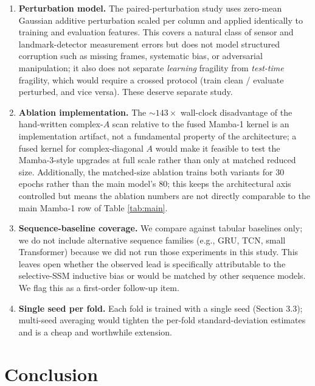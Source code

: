 \documentclass{article}
\begin{document}
\begin{enumerate}
    \item \textbf{Perturbation model.} The paired-perturbation study uses zero-mean Gaussian additive perturbation scaled per column and applied identically to training and evaluation features. This covers a natural class of sensor and landmark-detector measurement errors but does not model structured corruption such as missing frames, systematic bias, or adversarial manipulation; it also does not separate \emph{learning} fragility from \emph{test-time} fragility, which would require a crossed protocol (train clean / evaluate perturbed, and vice versa). These deserve separate study.

    \item \textbf{Ablation implementation.} The ${\sim}143\times$ wall-clock disadvantage of the hand-written complex-$A$ scan relative to the fused Mamba-1 kernel is an implementation artifact, not a fundamental property of the architecture; a fused kernel for complex-diagonal $A$ would make it feasible to test the Mamba-3-style upgrades at full scale rather than only at matched reduced size. Additionally, the matched-size ablation trains both variants for 30 epochs rather than the main model's 80; this keeps the architectural axis controlled but means the ablation numbers are not directly comparable to the main Mamba-1 row of Table \ref{tab:main}.

    \item \textbf{Sequence-baseline coverage.} We compare against tabular baselines only; we do not include alternative sequence families (e.g., GRU, TCN, small Transformer) because we did not run those experiments in this study. This leaves open whether the observed lead is specifically attributable to the selective-SSM inductive bias or would be matched by other sequence models. We flag this as a first-order follow-up item.

    \item \textbf{Single seed per fold.} Each fold is trained with a single seed (Section 3.3); multi-seed averaging would tighten the per-fold standard-deviation estimates and is a cheap and worthwhile extension.
\end{enumerate}

\section{Conclusion}
\end{document}
